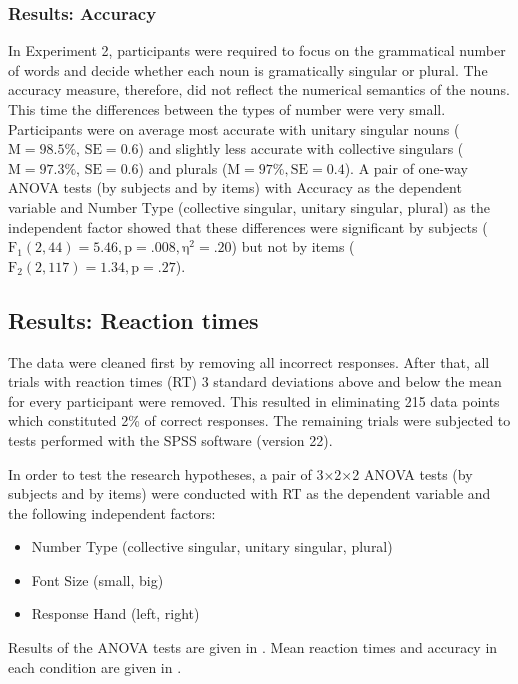 \documentclass[output=paper]{langscibook}
\begin{document}
\subsubsection{Results: Accuracy}
In Experiment 2, participants were required to focus on the grammatical number of words and decide whether each noun is gramatically singular or plural. The accuracy measure, therefore, did not reflect the numerical semantics of the nouns. This time the differences between the types of number were very small. Participants were on average most accurate with unitary singular nouns ($\text{M}=98.5\%$, $\text{SE}=0.6$) and slightly less accurate with collective singulars ($\text{M}=97.3\%$, $\text{SE}=0.6$) and plurals ($\text{M}=97\%, \text{SE}=0.4$). A pair of one-way ANOVA tests (by subjects and by items) with Accuracy as the dependent variable and Number Type (collective singular, unitary singular, plural) as the independent factor showed that these differences were significant by subjects ($\text{F}_{1}(2,44)=5.46, \text{p}=.008, \text{η}^{2}=.20$) but not by items ($\text{F}_{2}(2,117)=1.34, \text{p}=.27$).

\subsection{Results: Reaction times}
The data were cleaned first by removing all incorrect responses. After that, all trials with reaction times (RT) 3 standard deviations above and below the mean for every participant were removed. This resulted in eliminating 215 data points which constituted 2\% of correct responses. The remaining trials were subjected to tests performed with the SPSS software (version 22).

In order to test the research hypotheses, a pair of 3×2×2 ANOVA tests (by subjects and by items) were conducted with RT as the dependent variable and the following independent factors:

\begin{itemize}
\item Number Type (collective singular, unitary singular, plural)
\item Font Size (small, big)
\item Response Hand (left, right)
\end{itemize}

Results of the ANOVA tests are given in . Mean reaction times and accuracy in each condition are given in .
\end{document}
